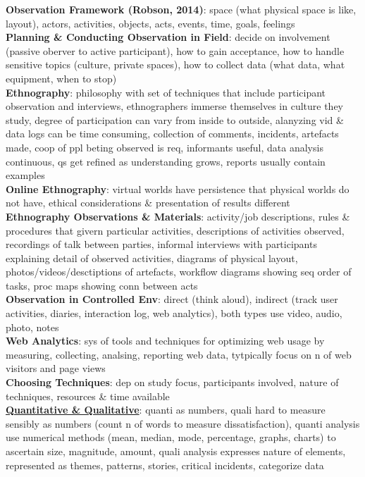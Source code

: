 \documentclass[a4paper]{article}
\begin{document}
\begin{multicols}{3}
        \textbf{Observation Framework (Robson, 2014)}: space (what physical space is like, layout), actors, activities, objects, acts, events, time, goals, feelings\\
        \textbf{Planning \& Conducting Observation in Field}: decide on involvement (passive oberver to active participant), how to gain acceptance, how to handle sensitive topics (culture, private spaces), how to collect data (what data, what equipment, when to stop)\\
        \textbf{Ethnography}: philosophy with set of techniques that include participant observation and interviews, ethnographers immerse themselves in culture they study, degree of participation can vary from inside to outside, alanyzing vid \& data logs can be time consuming, collection of comments, incidents, artefacts made, coop of ppl beting observed is req, informants useful, data analysis continuous, qs get refined as understanding grows, reports usually contain examples\\
        \textbf{Online Ethnography}: virtual worlds have persistence that physical worlds do not have, ethical considerations \& presentation of results different\\
        \textbf{Ethnography Observations \& Materials}: activity/job descriptions, rules \& procedures that givern particular activities, descriptions of activities observed, recordings of talk between parties, informal interviews with participants explaining detail of observed activities, diagrams of physical layout, photos/videos/desctiptions of artefacts, workflow diagrams showing seq order of tasks, proc maps showing conn between acts\\
        \textbf{Observation in Controlled Env}: direct (think aloud), indirect (track user activities, diaries, interaction log, web analytics), both types use video, audio, photo, notes\\
        \textbf{Web Analytics}: sys of tools and techniques for optimizing web usage by measuring, collecting, analsing, reporting web data, tytpically focus on n of web visitors and page views\\
        \textbf{Choosing Techniques}: dep on study focus, participants involved, nature of techniques, resources \& time available\\
        \underline{\textbf{Quantitative \& Qualitative}}: quanti as numbers, quali hard to measure sensibly as numbers (count n of words to measure dissatisfaction), quanti analysis use numerical methods (mean, median, mode, percentage, graphs, charts) to ascertain size, magnitude, amount, quali analysis expresses nature of elements, represented as themes, patterns, stories, critical incidents, categorize data\\

\end{multicols}
\end{document}
